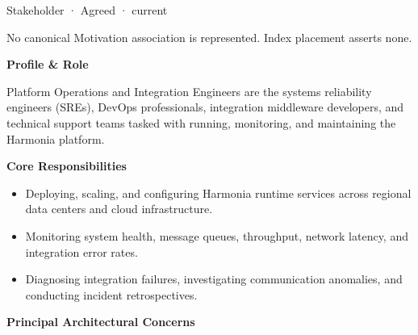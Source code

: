 \label{element:c20aa17ce4aa4a58be5eb3cff2ecdd1d}
{\small Stakeholder · Agreed · current}\par
No canonical Motivation association is represented. Index placement asserts none.\par

\par\medskip\textbf{Profile \& Role}\par


Platform Operations and Integration Engineers are the systems reliability engineers (SREs), DevOps professionals, integration middleware developers, and technical support teams tasked with running, monitoring, and maintaining the Harmonia platform.



\par\medskip\textbf{Core Responsibilities}\par


\begin{itemize}


\item Deploying, scaling, and configuring Harmonia runtime services across regional data centers and cloud infrastructure.

\item Monitoring system health, message queues, throughput, network latency, and integration error rates.

\item Diagnosing integration failures, investigating communication anomalies, and conducting incident retrospectives.

\end{itemize}


\par\medskip\textbf{Principal Architectural Concerns}\par


